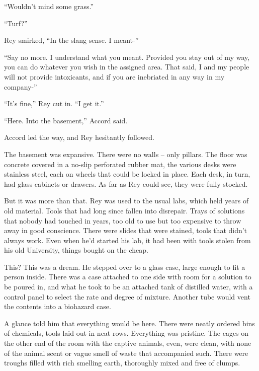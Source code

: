 ``Wouldn't mind some grass.''



``Turf?''



Rey smirked, ``In the slang sense.  I meant-''



``Say no more.  I understand what you meant.  Provided you stay out of my way, you can do whatever you wish in the assigned area.  That said, I and my people will not provide intoxicants, and if you are inebriated in any way in my company-''



``It's fine,'' Rey cut in.  ``I get it.''



``Here.  Into the basement,'' Accord said.



Accord led the way, and Rey hesitantly followed.



The basement was expansive.  There were no walls – only pillars.  The floor was concrete covered in a no-slip perforated rubber mat, the various desks were stainless steel, each on wheels that could be locked in place.  Each desk, in turn, had glass cabinets or drawers.  As far as Rey could see, they were fully stocked.



But it was more than that.  Rey was used to the usual labs, which held years of old material.  Tools that had long since fallen into disrepair.  Trays of solutions that nobody had touched in years, too old to use but too expensive to throw away in good conscience.  There were slides that were stained, tools that didn't always work.  Even when he'd started his lab, it had been with tools stolen from his old University, things bought on the cheap.



This?  This was a dream.  He stepped over to a glass case, large enough to fit a person inside.  There was a case attached to one side with room for a solution to be poured in, and what he took to be an attached tank of distilled water, with a control panel to select the rate and degree of mixture.  Another tube would vent the contents into a biohazard case.



A glance told him that everything would be here.  There were neatly ordered bins of chemicals, tools laid out in neat rows.  Everything was pristine.  The cages on the other end of the room with the captive animals, even, were clean, with none of the animal scent or vague smell of waste that accompanied such.  There were troughs filled with rich smelling earth, thoroughly mixed and free of clumps.



